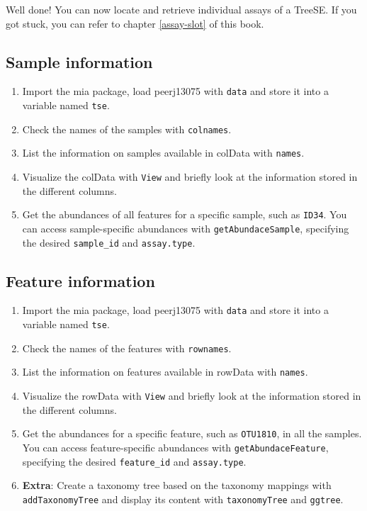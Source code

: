 \documentclass[
]{book}
\providecommand{\tightlist}{%
  \setlength{\itemsep}{0pt}\setlength{\parskip}{0pt}}
\begin{document}
Well done! You can now locate and retrieve individual assays of a TreeSE. If you
got stuck, you can refer to chapter \ref{assay-slot} of this book.

\hypertarget{sample-information}{%
\subsection{Sample information}\label{sample-information}}

\begin{enumerate}
\def\labelenumi{\arabic{enumi}.}
\tightlist
\item
  Import the mia package, load peerj13075 with \texttt{data} and store it into a
  variable named \texttt{tse}.
\item
  Check the names of the samples with \texttt{colnames}.
\item
  List the information on samples available in colData with \texttt{names}.
\item
  Visualize the colData with \texttt{View} and briefly look at the information stored
  in the different columns.
\item
  Get the abundances of all features for a specific sample, such as \texttt{ID34}. You
  can access sample-specific abundances with \texttt{getAbundaceSample}, specifying the
  desired \texttt{sample\_id} and \texttt{assay.type}.
\end{enumerate}

\hypertarget{feature-information}{%
\subsection{Feature information}\label{feature-information}}

\begin{enumerate}
\def\labelenumi{\arabic{enumi}.}
\tightlist
\item
  Import the mia package, load peerj13075 with \texttt{data} and store it into a
  variable named \texttt{tse}.
\item
  Check the names of the features with \texttt{rownames}.
\item
  List the information on features available in rowData with \texttt{names}.
\item
  Visualize the rowData with \texttt{View} and briefly look at the information stored
  in the different columns.
\item
  Get the abundances for a specific feature, such as \texttt{OTU1810}, in all the
  samples. You can access feature-specific abundances with \texttt{getAbundaceFeature},
  specifying the desired \texttt{feature\_id} and \texttt{assay.type}.
\item
  \textbf{Extra}: Create a taxonomy tree based on the taxonomy mappings with
  \texttt{addTaxonomyTree} and display its content with \texttt{taxonomyTree} and \texttt{ggtree}.
\end{enumerate}
\end{document}
